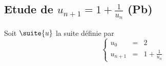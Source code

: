 
\subsection{Etude de $u_{n+1} =1 +\frac{1}{u_n}$ (Pb)}


\begin{exercice} 
Soit $\suite{u}$ la suite définie par 
$$\left\{ 
\begin{array}{ccl}
u_0&=&2\\
u_{n+1} &=&1 +\frac{1}{u_n}
\end{array}
\right.$$


\end{exercice}
